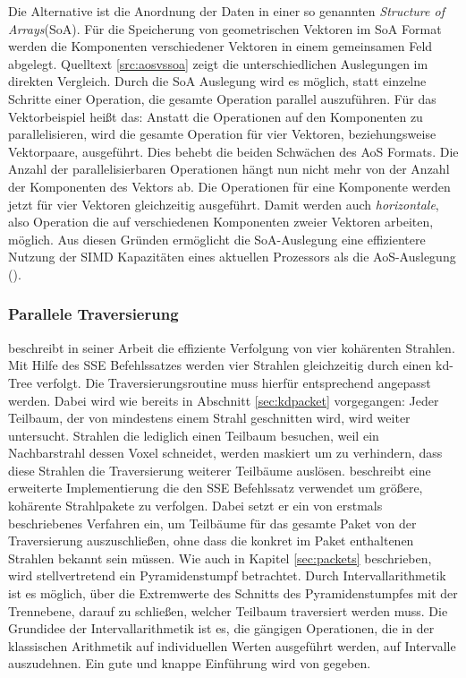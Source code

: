 Die Alternative ist die Anordnung der Daten in einer so genannten \textit{Structure of Arrays}(SoA). Für die Speicherung von geometrischen Vektoren im SoA Format werden die Komponenten verschiedener Vektoren in einem gemeinsamen Feld abgelegt. Quelltext \ref{src:aosvssoa} zeigt die unterschiedlichen Auslegungen im direkten Vergleich.
Durch die SoA Auslegung wird es möglich, statt einzelne Schritte einer Operation, die gesamte Operation parallel auszuführen. Für das Vektorbeispiel heißt das: Anstatt die Operationen auf den Komponenten zu parallelisieren, wird die gesamte Operation für vier Vektoren, beziehungsweise Vektorpaare, ausgeführt. Dies behebt die beiden Schwächen des AoS Formats. Die Anzahl der parallelisierbaren Operationen hängt nun nicht mehr von der Anzahl der Komponenten des Vektors ab. Die Operationen für eine Komponente werden jetzt für vier Vektoren gleichzeitig ausgeführt. Damit werden auch \textit{horizontale}, also Operation die auf verschiedenen Komponenten zweier Vektoren arbeiten, möglich.
Aus diesen Gründen ermöglicht die SoA-Auslegung eine effizientere Nutzung der SIMD Kapazitäten eines aktuellen Prozessors als die AoS-Auslegung (\cite{IntelOpt07}).

\subsubsection{Parallele Traversierung}

\cite{Wald04} beschreibt in seiner Arbeit die effiziente Verfolgung von vier kohärenten Strahlen. Mit Hilfe des SSE Befehlssatzes werden vier Strahlen gleichzeitig durch einen kd-Tree verfolgt. Die Traversierungsroutine muss hierfür entsprechend angepasst werden. Dabei wird wie bereits in Abschnitt \ref{sec:kdpacket} vorgegangen: Jeder Teilbaum, der von mindestens einem Strahl geschnitten wird, wird weiter untersucht. Strahlen die lediglich einen Teilbaum besuchen, weil ein Nachbarstrahl dessen Voxel schneidet, werden maskiert um zu verhindern, dass diese Strahlen die Traversierung weiterer Teilbäume auslösen.
\cite{Benthin06} beschreibt eine erweiterte Implementierung die den SSE Befehlssatz verwendet um größere, kohärente Strahlpakete zu verfolgen. Dabei setzt er ein von \cite{Reshetov05} erstmals beschriebenes Verfahren ein, um Teilbäume für das gesamte Paket von der Traversierung auszuschließen, ohne dass die konkret im Paket enthaltenen Strahlen bekannt sein müssen. Wie auch in Kapitel \ref{sec:packets} beschrieben, wird stellvertretend ein Pyramidenstumpf betrachtet. Durch Intervallarithmetik ist es möglich, über die Extremwerte des Schnitts des Pyramidenstumpfes mit der Trennebene, darauf zu schließen, welcher Teilbaum traversiert werden muss. Die Grundidee der Intervallarithmetik ist es, die gängigen Operationen, die in der klassischen Arithmetik auf individuellen Werten ausgeführt werden, auf Intervalle auszudehnen. Ein gute und knappe Einführung wird von \cite{BWS06} gegeben.

